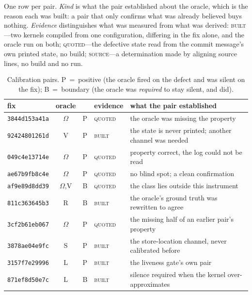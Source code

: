 One row per pair. \emph{Kind} is what the pair established about the oracle, which is
the reason each was built: a pair that only confirms what was already believed buys
nothing. \emph{Evidence} distinguishes what was measured from what was derived:
\textsc{built}---two kernels compiled from one configuration, differing in the fix
alone, and the oracle run on both; \textsc{quoted}---the defective state read from the
commit message's own printed state, no build; \textsc{source}---a determination made
by aligning source lines, no build and no run.

\begin{table}[h]
\caption{Calibration pairs. P~=~positive (the oracle fired on the defect and was
silent on the fix); B~=~boundary (the oracle was \emph{required} to stay silent, and
did).}
\label{tab:pairs}
\scriptsize
\setlength{\tabcolsep}{2.5pt}
\begin{tabular}{@{}l@{\hspace{4pt}}c@{\hspace{4pt}}c@{\hspace{4pt}}l@{\hspace{4pt}}p{}@{}}
\toprule
fix & oracle & & evidence & what the pair established \\
\midrule
\texttt{3844d153a41a} & $\Omega$ & P & \textsc{quoted} & the oracle was missing the property \\
\texttt{92424801261d} & V & P & \textsc{built} & the state is never printed; another channel was needed \\
\texttt{049c4e13714e} & $\Omega$ & P & \textsc{quoted} & property correct, the log could not be read \\
\texttt{ae67b9fb8c4e} & $\Omega$ & P & \textsc{quoted} & no blind spot; a clean confirmation \\
\texttt{af9e89d8dd39} & $\Omega$,V & B & \textsc{quoted} & the class lies outside this instrument \\
\texttt{811c363645b3} & R & B & \textsc{built} & the oracle's ground truth was rewritten to agree \\
\texttt{3cf2b61eb067} & $\Omega$ & P & \textsc{quoted} & the missing half of an earlier pair's property \\
\texttt{3878ae04e9fc} & S & P & \textsc{built} & the store-location channel, never calibrated before \\
\texttt{3157f7e29996} & L & P & \textsc{built} & the liveness gate's own pair \\
\texttt{871ef8d50e7c} & L & B & \textsc{built} & silence required when the kernel over-approximates \\

\end{tabular}
\end{table}
